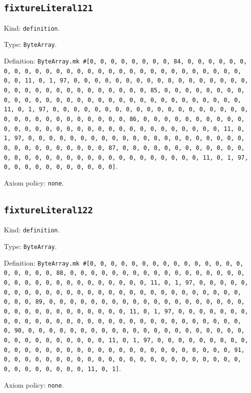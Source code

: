 \documentclass[11pt]{article}
\begin{document}
\subsection*{\texttt{fixtureLiteral121}}
\noindent Kind: \texttt{definition}.\par
\noindent Type: \texttt{ByteArray}.\par
\noindent Definition: \texttt{ByteArray.mk \#[0, 0, 0, 0, 0, 0, 0, 0, 84, 0, 0, 0, 0, 0, 0, 0, 0, 0, 0, 0, 0, 0, 0, 0, 0, 0, 0, 0, 0, 0, 0, 0, 0, 0, 0, 0, 0, 0, 0, 0, 11, 0, 1, 97, 0, 0, 0, 0, 0, 0, 0, 0, 0, 0, 0, 0, 0, 0, 0, 0, 0, 0, 0, 0, 0, 0, 0, 0, 0, 0, 0, 0, 0, 0, 0, 85, 0, 0, 0, 0, 0, 0, 0, 0, 0, 0, 0, 0, 0, 0, 0, 0, 0, 0, 0, 0, 0, 0, 0, 0, 0, 0, 0, 0, 0, 0, 0, 11, 0, 1, 97, 0, 0, 0, 0, 0, 0, 0, 0, 0, 0, 0, 0, 0, 0, 0, 0, 0, 0, 0, 0, 0, 0, 0, 0, 0, 0, 0, 0, 0, 0, 0, 86, 0, 0, 0, 0, 0, 0, 0, 0, 0, 0, 0, 0, 0, 0, 0, 0, 0, 0, 0, 0, 0, 0, 0, 0, 0, 0, 0, 0, 0, 0, 0, 11, 0, 1, 97, 0, 0, 0, 0, 0, 0, 0, 0, 0, 0, 0, 0, 0, 0, 0, 0, 0, 0, 0, 0, 0, 0, 0, 0, 0, 0, 0, 0, 0, 0, 0, 87, 0, 0, 0, 0, 0, 0, 0, 0, 0, 0, 0, 0, 0, 0, 0, 0, 0, 0, 0, 0, 0, 0, 0, 0, 0, 0, 0, 0, 0, 0, 0, 11, 0, 1, 97, 0, 0, 0, 0, 0, 0, 0, 0, 0, 0, 0]}.\par
\noindent Axiom policy: \texttt{none}.\par
\subsection*{\texttt{fixtureLiteral122}}
\noindent Kind: \texttt{definition}.\par
\noindent Type: \texttt{ByteArray}.\par
\noindent Definition: \texttt{ByteArray.mk \#[0, 0, 0, 0, 0, 0, 0, 0, 0, 0, 0, 0, 0, 0, 0, 0, 0, 0, 0, 0, 88, 0, 0, 0, 0, 0, 0, 0, 0, 0, 0, 0, 0, 0, 0, 0, 0, 0, 0, 0, 0, 0, 0, 0, 0, 0, 0, 0, 0, 0, 0, 0, 11, 0, 1, 97, 0, 0, 0, 0, 0, 0, 0, 0, 0, 0, 0, 0, 0, 0, 0, 0, 0, 0, 0, 0, 0, 0, 0, 0, 0, 0, 0, 0, 0, 0, 0, 89, 0, 0, 0, 0, 0, 0, 0, 0, 0, 0, 0, 0, 0, 0, 0, 0, 0, 0, 0, 0, 0, 0, 0, 0, 0, 0, 0, 0, 0, 0, 0, 11, 0, 1, 97, 0, 0, 0, 0, 0, 0, 0, 0, 0, 0, 0, 0, 0, 0, 0, 0, 0, 0, 0, 0, 0, 0, 0, 0, 0, 0, 0, 0, 0, 0, 0, 90, 0, 0, 0, 0, 0, 0, 0, 0, 0, 0, 0, 0, 0, 0, 0, 0, 0, 0, 0, 0, 0, 0, 0, 0, 0, 0, 0, 0, 0, 0, 0, 11, 0, 1, 97, 0, 0, 0, 0, 0, 0, 0, 0, 0, 0, 0, 0, 0, 0, 0, 0, 0, 0, 0, 0, 0, 0, 0, 0, 0, 0, 0, 0, 0, 0, 0, 91, 0, 0, 0, 0, 0, 0, 0, 0, 0, 0, 0, 0, 0, 0, 0, 0, 0, 0, 0, 0, 0, 0, 0, 0, 0, 0, 0, 0, 0, 0, 0, 11, 0, 1]}.\par
\noindent Axiom policy: \texttt{none}.\par
\end{document}
